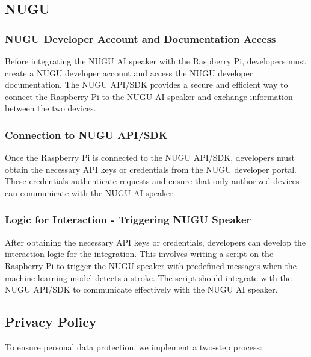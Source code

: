 \subsection{\textbf{NUGU}}

\subsubsection{\textbf{NUGU Developer Account and Documentation Access}}
Before integrating the NUGU AI speaker with the Raspberry Pi, developers must create a NUGU developer account and access the NUGU developer documentation. 
The NUGU API/SDK provides a secure and efficient way to connect the Raspberry Pi to the NUGU AI speaker and exchange information between the two devices.\\

\subsubsection{\textbf{Connection to NUGU API/SDK}}
Once the Raspberry Pi is connected to the NUGU API/SDK, developers must obtain the necessary API keys or credentials from the NUGU developer portal. These credentials authenticate requests and ensure that only authorized devices can communicate with the NUGU AI speaker.\\

\subsubsection{\textbf{Logic for Interaction - Triggering NUGU Speaker}}
After obtaining the necessary API keys or credentials, developers can develop the interaction logic for the integration. This involves writing a script on the Raspberry Pi to trigger the NUGU speaker with predefined messages when the machine learning model detects a stroke. The script should integrate with the NUGU API/SDK to communicate effectively with the NUGU AI speaker.\\


\subsection{\textbf{Privacy Policy}}
To ensure personal data protection, we implement a two-step process:\\

